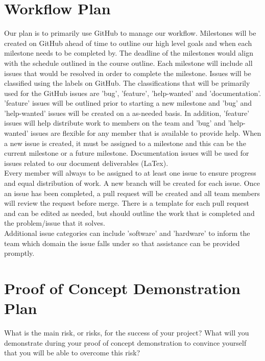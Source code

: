 \documentclass{article}
\begin{document}
\section{Workflow Plan}

\noindent Our plan is to primarily use GitHub to manage our workflow. 
Milestones will be created on GitHub ahead of time to outline our high level goals and when each milestone needs to be completed by.
The deadline of the milestones would align with the schedule outlined in the course outline.
Each milestone will include all issues that would be resolved in order to complete the milestone. 
Issues will be classified using the labels on GitHub. The classifications that will be primarily used for the 
GitHub issues are 'bug', 'feature', 'help-wanted' and 'documentation'. 'feature' issues will be outlined prior to starting a 
new milestone and 'bug' and 'help-wanted' issues will be created on a as-needed basis. In addition, 'feature' issues will help distribute work to 
members on the team and 'bug' and 'help-wanted' issues are flexible for any member that is available to provide help. 
When a new issue is created, it must be assigned to a milestone and this can be the current milestone or a future milestone.
Documentation issues will be used for issues related to our document deliverables (LaTex). \\

\noindent Every member will always to be assigned to at least one issue to ensure progress and equal distribution of work.
A new branch will be created for each issue. Once an issue has been completed, 
a pull request will be created and all team members will review the request before merge. 
There is a template for each pull request and can be edited as needed, but should outline the work that is completed
and the problem/issue that it solves. \\

\noindent Additional issue categories can include 'software' and 'hardware' to inform the team which domain the issue falls under so 
that assistance can be provided promptly.

\section{Proof of Concept Demonstration Plan}

What is the main risk, or risks, for the success of your project?  What will you
demonstrate during your proof of concept demonstration to convince yourself that
you will be able to overcome this risk?
\end{document}
